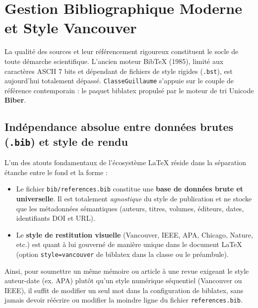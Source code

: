 \section{Gestion Bibliographique Moderne et Style Vancouver}
\label{sec:bibliographie_vancouver}

La qualité des sources et leur référencement rigoureux constituent le socle de toute démarche scientifique.
L'ancien moteur \textsf{Bib\TeX{}} (1985), limité aux caractères ASCII 7 bits et dépendant de fichiers de style rigides (\texttt{.bst}), est aujourd'hui totalement dépassé.
\texttt{ClasseGuillaume} s'appuie sur le couple de référence contemporain : le paquet \textsf{biblatex} propulsé par le moteur de tri Unicode \textbf{Biber}.

\subsection{Indépendance absolue entre données brutes (\texttt{.bib}) et style de rendu}
\label{subsec:independance_bib_style}

L'un des atouts fondamentaux de l'écosystème \LaTeX{} réside dans la séparation étanche entre le fond et la forme :
\begin{itemize}
  \item Le fichier \texttt{bib/references.bib} constitue une \textbf{base de données brute et universelle}.
  Il est totalement \emph{agnostique} du style de publication et ne stocke que les métadonnées sémantiques (auteurs, titres, volumes, éditeurs, dates, identifiants DOI et URL).
  \item Le \textbf{style de restitution visuelle} (Vancouver, IEEE, APA, Chicago, Nature, etc.) est quant à lui gouverné de manière unique dans le document \LaTeX{} (option \texttt{style=vancouver} de \textsf{biblatex} dans la classe ou le préambule).
\end{itemize}

Ainsi, pour soumettre un même mémoire ou article à une revue exigeant le style auteur-date (ex. APA) plutôt qu'un style numérique séquentiel (Vancouver ou IEEE), il suffit de modifier un seul mot dans la configuration de \textsf{biblatex}, sans jamais devoir réécrire ou modifier la moindre ligne du fichier \texttt{references.bib}.

